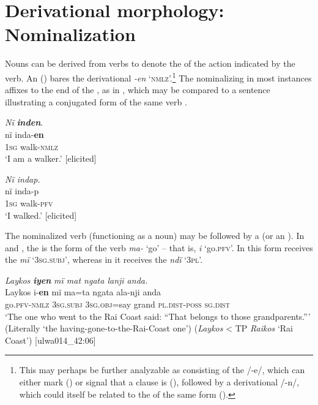 
\section{Derivational morphology: Nominalization}\label{sec:3.2}


Nouns can be derived from verbs to denote the  of the action indicated by the verb. An  () bares the derivational  \textit{\nobreakdash-en} ‘\textsc{nmlz}’.\footnote{This  may perhaps be further analyzable as consisting of the   /-e/, which can either mark   () or signal that a clause is  (), followed by a derivational  /-n/, which could itself be related to the  of the same form ().} The nominalizing  in most instances affixes to the end of the , as in , which may be compared to a sentence illustrating a conjugated form of the same verb .

\ea%
    \label{ex:nouns:16}
          \textit{Nï} \textbf{\textit{inden}}.\\
\gll nï    inda-\textbf{en}\\
    \textsc{1sg}  walk-\textsc{nmlz}\\
\glt `I am a walker.’ [elicited]
\z

\ea%
    \label{ex:nouns:17}
          \textit{Nï indap.}\\
\gll    nï    inda-p\\
    \textsc{1sg}  walk-\textsc{pfv}\\
\glt `I walked.’ [elicited]
\z

The nominalized verb (functioning as a noun) may be followed by a  (or an ). In  and , the  is the   form of the verb \textit{ma-} ‘go’ -- that is, \textit{i} ‘go.\textsc{pfv}’. In  this form receives the   \textit{mï} ‘\textsc{3sg.subj}’, whereas in  it receives the   \textit{ndï} ‘\textsc{3pl}’.

\ea%
    \label{ex:nouns:18}
          \textit{Laykos} \textbf{\textit{iyen}} \textit{mï mat ngata lanji anda.}\\
    \gll Laykos  i-\textbf{en}      mï      ma=ta      ngata    ala-nji       anda\\
    [place]  go.\textsc{pfv-nmlz}  \textsc{3sg.subj}  \textsc{3sg.obj=}say  grand    \textsc{pl.dist-poss}  \textsc{sg.dist}\\
\glt `The one who went to the Rai Coast said: “That belongs to those grandparents.”’ (Literally ‘the having-gone-to-the-Rai-Coast one’) (\textit{Laykos} < TP \textit{Raikos} ‘Rai Coast’) [ulwa014\_42:06]
\z

